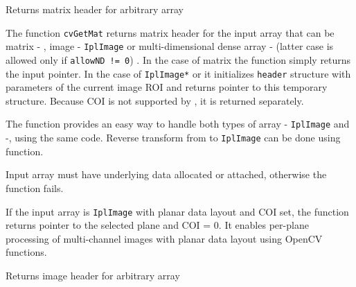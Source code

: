 
Returns matrix header for arbitrary array


\begin{description}
\end{description}

The function \texttt{cvGetMat} returns matrix header for the input array that can be matrix - , image - \texttt{IplImage} or multi-dimensional dense array -  (latter case is allowed only if \texttt{allowND != 0}) . In the case of matrix the function simply returns the input pointer. In the case of \texttt{IplImage*} or  it initializes \texttt{header} structure with parameters of the current image ROI and returns pointer to this temporary structure. Because COI is not supported by , it is returned separately.

The function provides an easy way to handle both types of array - \texttt{IplImage} and  -, using the same code. Reverse transform from  to \texttt{IplImage} can be done using  function.

Input array must have underlying data allocated or attached, otherwise the function fails.

If the input array is \texttt{IplImage} with planar data layout and COI set, the function returns pointer to the selected plane and COI = 0. It enables per-plane processing of multi-channel images with planar data layout using OpenCV functions.


Returns image header for arbitrary array


\begin{description}
\end{description}

